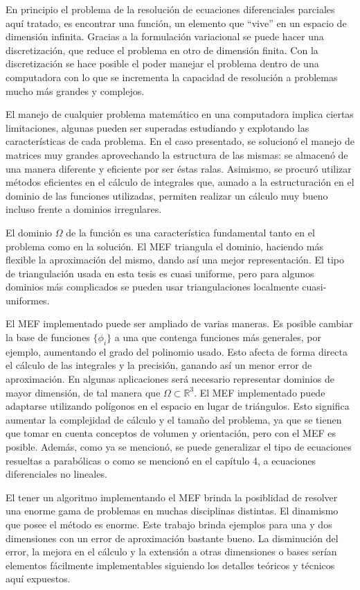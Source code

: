 \documentclass[12pt,spanish,oneside]{book}
\theoremstyle{plain}
\numberwithin{equation}{chapter}
\theoremstyle{definition}
\theoremstyle{remark}
\newcommand{\re}{\mathbb{R}}
\begin{document}
En principio el problema de la resolución de ecuaciones diferenciales parciales aquí tratado, es encontrar una función, un elemento que ``vive'' en un espacio de dimensión infinita. Gracias a la formulación variacional se puede hacer una discretización, que reduce el problema en otro de dimensión finita. Con la discretización se hace posible el poder manejar el problema dentro de una computadora con lo que se incrementa la capacidad de resolución a problemas mucho más grandes y complejos. 

El manejo de cualquier problema matemático en una computadora implica ciertas limitaciones, algunas pueden ser superadas estudiando y explotando las características de cada problema. En el caso presentado, se solucionó el manejo de matrices muy grandes aprovechando la estructura de las mismas: se almacenó de una manera diferente y eficiente por ser éstas ralas. Asimismo, se procuró utilizar métodos eficientes en el cálculo de integrales que, aunado a la estructuración en el dominio de las funciones utilizadas, permiten realizar un cálculo muy bueno incluso frente a dominios irregulares.

El dominio $\Omega$ de la función es una característica fundamental tanto en el problema como en la solución. El MEF triangula el dominio, haciendo más flexible la aproximación del mismo, dando así una mejor representación. El tipo de triangulación usada en esta tesis es cuasi uniforme, pero para algunos dominios más complicados se pueden usar triangulaciones localmente cuasi-uniformes.

El MEF implementado puede ser ampliado de varias maneras. Es posible cambiar la base de funciones $\lbrace\phi_i\rbrace$ a una que contenga funciones más generales, por ejemplo, aumentando el grado del polinomio usado. Esto afecta de forma directa el cálculo de las integrales y la precisión, ganando así un menor error de aproximación. En algunas aplicaciones será necesario representar dominios de mayor dimensión, de tal manera que $\Omega\subset\re^3$. El MEF implementado puede adaptarse utilizando polígonos en el espacio en lugar de triángulos. Esto significa aumentar la complejidad de cálculo y el tamaño del problema, ya que se tienen que tomar en cuenta conceptos de volumen y orientación, pero con el MEF es posible. Además, como ya se mencionó, se puede generalizar el tipo de ecuaciones resueltas a parabólicas o como se mencionó en el capítulo 4, a ecuaciones diferenciales no lineales. 

El tener un algoritmo implementando el MEF brinda la posiblidad de resolver una enorme gama de problemas en muchas disciplinas distintas. El dinamismo que posee el método es enorme. Este trabajo brinda ejemplos para una y dos dimensiones con un error de aproximación bastante bueno. La disminución del error, la mejora en el cálculo y la extensión a otras dimensiones o bases serían elementos fácilmente implementables siguiendo los detalles teóricos y técnicos aquí expuestos.
\end{document}
